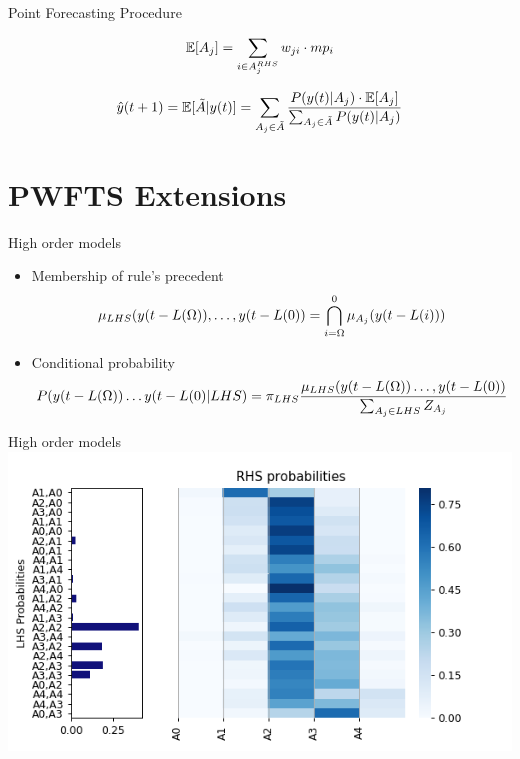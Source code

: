 \documentclass{beamer}
\begin{document}
\begin{frame}{Point Forecasting Procedure}

$$
\mathbb{E}[ A_j ] = \displaystyle \sum_{i \in A_j^{RHS}} w_{ji}\cdot mp_i
$$

$$
\hat{y}(t+1) = \displaystyle \mathbb{E}[ \tilde{A} | y(t) ] =  \sum_{A_j \in \tilde{A}} \frac{ P(y(t) | A_j) \cdot \mathbb{E}[ A_j ]} { \sum_{A_j \in \tilde{A}} P(y(t) | A_j)}
$$
\end{frame}


\section{PWFTS Extensions}


\begin{frame}{High order models}
\begin{itemize}
    \item Membership of rule's precedent
$$
\displaystyle  \mu_{LHS}(y(t-L(\Omega)),\ldots,y(t-L(0)) = \bigcap_{i = \Omega}^0 \mu_{A_j}(y(t-L(i)))
$$
    \item Conditional probability
$$
P(y(t-L(\Omega))\ldots y(t-L(0) | LHS) = \pi_{LHS} \frac{\mu_{LHS}(y(t-L(\Omega))\ldots,y(t-L(0))}{\sum_{A_j \in LHS} Z_{A_j}}
$$
\end{itemize}
\end{frame}


\begin{frame}{High order models}
\includegraphics[width=\textwidth]{figures/pwfts_densities_secondorder.png}
\end{frame}
\end{document}
